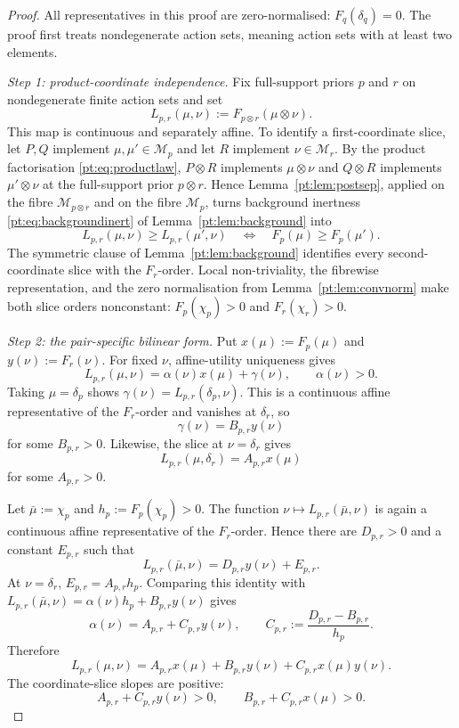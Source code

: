 \documentclass[11pt,a4paper]{article}
\theoremstyle{definition}
\newcommand{\1}{\mathbf 1}
\begin{document}
\begin{proof}
All representatives in this proof are zero-normalised: $F_q(\delta_q)=0$.  The proof first treats nondegenerate action
sets, meaning action sets with at least two elements.

\emph{Step 1: product-coordinate independence.}
Fix full-support priors $p$ and $r$ on nondegenerate finite action sets and set
\[
L_{p,r}(\mu,\nu):=F_{p\otimes r}(\mu\otimes\nu).
\]
This map is continuous and separately affine.  To identify a first-coordinate slice, let $P,Q$ implement
$\mu,\mu'\in\mathcal M_p$ and let $R$ implement $\nu\in\mathcal M_r$.  By the product factorisation
\eqref{pt:eq:productlaw}, $P\otimes R$ implements $\mu\otimes\nu$ and $Q\otimes R$ implements $\mu'\otimes\nu$ at the
full-support prior $p\otimes r$.  Hence Lemma~\ref{pt:lem:postsep}, applied on the fibre $\mathcal M_{p\otimes r}$ and on
the fibre $\mathcal M_p$, turns background inertness
\eqref{pt:eq:backgroundinert} of Lemma~\ref{pt:lem:background} into
\[
L_{p,r}(\mu,\nu)\ge L_{p,r}(\mu',\nu)
\quad\Longleftrightarrow\quad
F_p(\mu)\ge F_p(\mu').
\]
The symmetric clause of Lemma~\ref{pt:lem:background} identifies every second-coordinate slice with the $F_r$-order.  Local non-triviality, the
fibrewise representation, and the zero normalisation from Lemma~\ref{pt:lem:convnorm} make both slice orders nonconstant:
$F_p(\chi_p)>0$ and $F_r(\chi_r)>0$.

\emph{Step 2: the pair-specific bilinear form.}
Put $x(\mu):=F_p(\mu)$ and $y(\nu):=F_r(\nu)$.  For fixed $\nu$, affine-utility uniqueness gives
\[
L_{p,r}(\mu,\nu)=\alpha(\nu)x(\mu)+\gamma(\nu),
\qquad \alpha(\nu)>0.
\]
Taking $\mu=\delta_p$ shows $\gamma(\nu)=L_{p,r}(\delta_p,\nu)$.  This is a continuous affine representative of the
$F_r$-order and vanishes at $\delta_r$, so
\[
\gamma(\nu)=B_{p,r}y(\nu)
\]
for some $B_{p,r}>0$.  Likewise, the slice at $\nu=\delta_r$ gives
\[
L_{p,r}(\mu,\delta_r)=A_{p,r}x(\mu)
\]
for some $A_{p,r}>0$.

Let $\bar\mu:=\chi_p$ and $h_p:=F_p(\chi_p)>0$.  The function
$\nu\mapsto L_{p,r}(\bar\mu,\nu)$ is again a continuous affine representative of the $F_r$-order.  Hence there are
$D_{p,r}>0$ and a constant $E_{p,r}$ such that
\[
L_{p,r}(\bar\mu,\nu)=D_{p,r}y(\nu)+E_{p,r}.
\]
At $\nu=\delta_r$, $E_{p,r}=A_{p,r}h_p$.  Comparing this identity with
$L_{p,r}(\bar\mu,\nu)=\alpha(\nu)h_p+B_{p,r}y(\nu)$ gives
\[
\alpha(\nu)=A_{p,r}+C_{p,r}y(\nu),
\qquad
C_{p,r}:=\frac{D_{p,r}-B_{p,r}}{h_p}.
\]
Therefore
\begin{equation}
L_{p,r}(\mu,\nu)
=A_{p,r}x(\mu)+B_{p,r}y(\nu)+C_{p,r}x(\mu)y(\nu).
\tag{BIL}\label{pt:eq:pairbilinear}
\end{equation}
The coordinate-slice slopes are positive:
\[
A_{p,r}+C_{p,r}y(\nu)>0,
\qquad
B_{p,r}+C_{p,r}x(\mu)>0.
\]


\end{proof}
\end{document}
